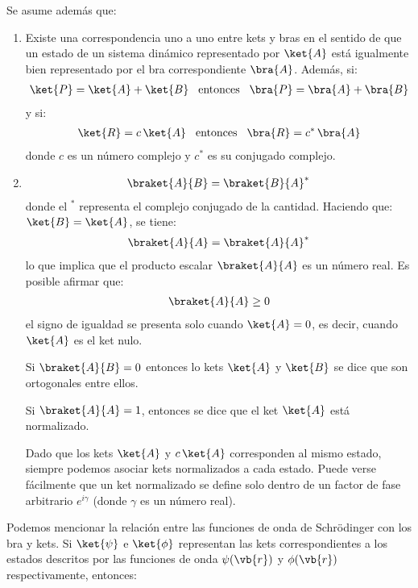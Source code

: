 Se asume además que:
\begin{enumerate}[label=(\roman*)]
\item Existe una correspondencia uno a uno entre kets y bras en el sentido de que un estado de un sistema dinámico representado por $\ket{A}$ está igualmente bien representado por el bra correspondiente $\bra{A}$. Además, si:
\begin{align}
\ket{P} = \ket{A} + \ket{B} \hspace{0.3cm} \mbox{entonces} \hspace{0.3cm} \bra{P} = \bra{A} + \bra{B}
\label{eq:ecuacion_04}
\end{align}
y si:
\begin{align}
\ket{R} = c \, \ket{A} \hspace{0.3cm} \mbox{entonces} \hspace{0.3cm} \bra{R} = c^{*} \, \bra{A}
\label{eq:ecuacion_05}
\end{align}
donde $c$ es un número complejo y $c^{*}$ es su conjugado complejo.
\item \begin{align}
\braket{A}{B} = \braket{B}{A}^{*}
\label{eq:ecuacion_06}
\end{align}
donde el ${}^{*}$ representa el complejo conjugado de la cantidad. Haciendo que: $\ket{B} = \ket{A}$, se tiene:
\begin{align*}
\braket{A}{A} = \braket{A}{A}^{*}
\end{align*}
lo que implica que el producto escalar $\braket{A}{A}$ es un número real. Es posible afirmar que:
\begin{align}
\braket{A}{A} \geq 0
\label{eq:ecuacion_07}
\end{align}
el signo de igualdad se presenta solo cuando $\ket{A} = 0$, es decir, cuando $\ket{A}$ es el ket nulo.
\par
\noindent
Si $\braket{A}{B} = 0$ entonces lo kets $\ket{A}$ y $\ket{B}$ se dice que son ortogonales entre ellos.
\par
\noindent
Si $\braket{A}{A} = 1$, entonces se dice que el ket $\ket{A}$ está normalizado.
\par
Dado que los kets $\ket{A}$ y $c \, \ket{A}$ corresponden al mismo estado, siempre podemos asociar kets normalizados a cada estado. Puede verse fácilmente que un ket normalizado se define solo dentro de un factor de fase arbitrario $e^{i \gamma}$ (donde $\gamma$ es un número real).
\end{enumerate}

Podemos mencionar la relación entre las funciones de onda de Schrödinger con los bra y kets. Si $\ket{\psi}$ e $\ket{\phi}$ representan las kets correspondientes a los estados descritos por las funciones de onda $\psi(\vb{r})$ y $\phi(\vb{r})$ respectivamente, entonces:


